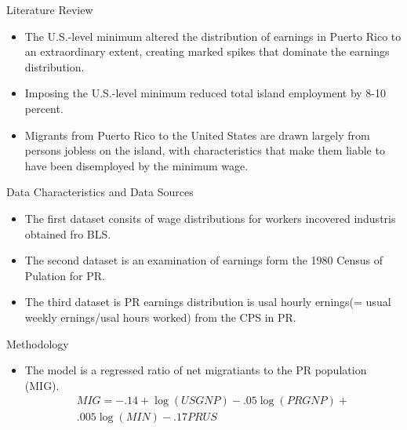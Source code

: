 \documentclass[12pt]{beamer}
\begin{document}
\begin{frame}[allowframebreaks]{Literature Review}
	\begin{itemize}
		\item The U.S.-level minimum altered the distribution of earnings in Puerto Rico to an extraordinary extent, creating marked spikes that dominate
		      the earnings distribution. \cite{brown1988minimum}
		\item Imposing the U.S.-level minimum reduced total island employment by 8-10 percent. \cite{brown1982effect}
		\item Migrants from Puerto Rico to the United States are drawn largely from persons jobless on the island, with characteristics that make them
		      liable to have been disemployed by the minimum wage. \cite{castillo1983jobless}
	\end{itemize}

\end{frame}

\begin{frame}[allowframebreaks]{Data Characteristics and Data Sources}
	\begin{itemize}
		\item The first dataset consits of wage distributions for workers incovered industris obtained fro BLS.
		\item The second dataset is an examination of earnings form the 1980 Census of Pulation for PR.
		\item The third dataset is PR earnings distribution is usal hourly ernings(= usual weekly ernings/usal hours worked) from the CPS in PR.
	\end{itemize}
\end{frame}

\begin{frame}[allowframebreaks]{Methodology}
	\begin{itemize}
		\item The model is a regressed ratio of net migratiants to the PR population (MIG).
		      \begin{equation}
			      \begin{split}
				      MIG = -.14 + \log(USGNP) - .05 \log(PRGNP) + \\
				      .005 \log(MIN) - .17 PRUS
			      \end{split}
		      \end{equation}
	\end{itemize}

\end{frame}
\end{document}
